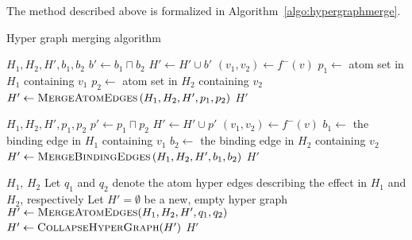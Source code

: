 \documentclass[../Master.tex]{subfiles}
\begin{document}
The method described above is formalized in Algorithm~\ref{algo:hypergraphmerge}.


\begin{algorithm}
    \caption{Hyper graph merging algorithm}
    \label{algo:hypergraphmerge}
    \begin{algorithmic}
         {$H_1, H_2, H', b_1, b_2$}
		\State $b' \gets b_1 \sqcap b_2$
            \State $H' \gets H' \cup b'$
                    \State $\left( v_1, v_2 \right) \gets f^-(v)$
                    \State $p_1 \gets$ atom set in $H_1$ containing $v_1$
                    \State $p_2 \gets$ atom set in $H_2$ containing $v_2$
                    \State $H' \gets \textsc{MergeAtomEdges}
                                        \left( H_1, H_2, H', p_1, p_2 \right)$
                \EndIf
            \EndFor
            \State \Return $H'$
        \EndFunction

         {$H_1, H_2, H', p_1, p_2$}
            \State $p' \gets p_1 \sqcap p_2$
            \State $H' \gets H' \cup p'$
                    \State $\left( v_1, v_2 \right) \gets f^-\left( v \right)$
                    \State $b_1 \gets$ the binding edge in $H_1$ containing $v_1$
                    \State $b_2 \gets$ the binding edge in $H_2$ containing $v_2$
                    \State $H' \gets \textsc{MergeBindingEdges}
                        \left( H_1, H_2, H', b_1, b_2 \right)$
                \EndIf
            \EndFor
            \State \Return $H'$
        \EndFunction

         {$H_1$, $H_2$}
            \State Let $q_1$ and $q_2$ denote the atom hyper edges describing the effect in $H_1$ and $H_2$, respectively
            \State Let $H' = \emptyset$ be a new, empty hyper graph
            \State $H' \gets \textsc{MergeAtomEdges}(H_1,H_2,H',q_1,q_2)$
            \State $H' \gets \textsc{CollapseHyperGraph}(H')$
            \State \Return $H'$
        \EndFunction
    \end{algorithmic}
\end{algorithm}
\end{document}
